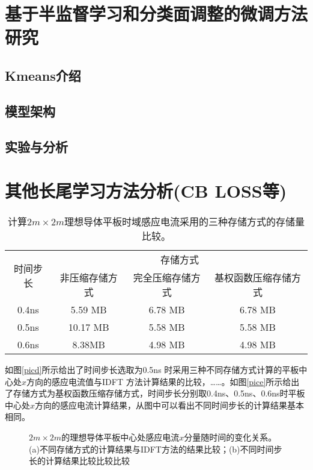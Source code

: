 \documentclass[master]{thesis-uestc}
\begin{document}
\chapter{基于半监督学习和分类面调整的微调方法研究}
\section{Kmeans介绍}
\section{模型架构}
\section{实验与分析}

\chapter{其他长尾学习方法分析(CB LOSS等)}

\begin{table}[h]
\caption{计算$2m\times 2m$理想导体平板时域感应电流采用的三种存储方式的存储量比较。}
\begin{tabular}{cccc}
\toprule
\multirow{2}{*}{时间步长} & \multicolumn{3}{c}{存储方式} \\
\cmidrule{2-4}
& 非压缩存储方式 & 完全压缩存储方式 & 基权函数压缩存储方式 \\
\midrule
0.4ns & 5.59 MB & 6.78 MB & 6.78 MB\\
0.5ns & 10.17 MB & 5.58 MB & 5.58 MB \\
0.6ns & 8.38MB & 4.98 MB & 4.98 MB \\
\bottomrule
\end{tabular}
\label{tablea}
\end{table}

如图\ref{picd}所示给出了时间步长选取为0.5ns 时采用三种不同存储方式计算的平板中心处$x$方向的感应电流值与IDFT 方法计算结果的比较，……。如图\ref{pice}所示给出了存储方式为基权函数压缩存储方式，时间步长分别取0.4ns、0.5ns、0.6ns时平板中心处$x$方向的感应电流计算结果，从图中可以看出不同时间步长的计算结果基本相同。

\begin{figure}[h]
\caption{$2m\times 2m$的理想导体平板中心处感应电流$x$分量随时间的变化关系。(a)不同存储方式的计算结果与IDFT方法的结果比较；(b)不同时间步长的计算结果比较比较比较}
\label{fig2}
\end{figure}
\end{document}
